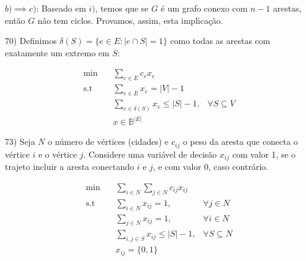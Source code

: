 \documentclass[]{article}
\begin{document}
\vspace{0.5cm}

$b) \implies c)$: Baseado em $i)$, temos que se $G$ é um grafo conexo com $n-1$ arestas, então $G$ não tem ciclos. Provamos, assim, esta implicação.

\vspace{0.5cm}

70) Definimos $\delta(S) = \{e \in E : |e \cap S| = 1\}$ como todas as arestas com exatamente um extremo em $S$:

\begin{align}
\min        &\quad  \sum_{e \in E} c_ex_e \\
\text{s.t}  &\quad  \sum_{e \in E} x_e = |V| - 1 \\
            &\quad  \sum_{e \in \delta(S)} x_e \leq |S| - 1, & \forall S \subseteq V \\
            &\quad  x \in \mathbb{B}^{|E|}
\end{align}

\vspace{0.5cm}

73) Seja $N$ o número de vértices (cidades) e $c_{ij}$ o peso da aresta que conecta o vértice $i$ e o vértice $j$. Considere uma variável de decisão $x_{ij}$ com valor 1, se o trajeto incluir a aresta conectando $i$ e $j$, e com valor 0, caso contrário.

\begin{align}
\min        &\quad  \sum_{i \in N} \sum_{j \in N} c_{ij} x_{ij} \\
\text{s.t}  &\quad  \sum_{i \in N} x_{ij} = 1, & \forall j \in N \\
            &\quad  \sum_{j \in N} x_{ij} = 1, & \forall i \in N \\
            &\quad  \sum_{i, j \in S} x_{ij} \leq |S| - 1, & \forall S \subseteq N \\
            &\quad  x_{ij} = {\{0, 1\}}
\end{align}
\end{document}
